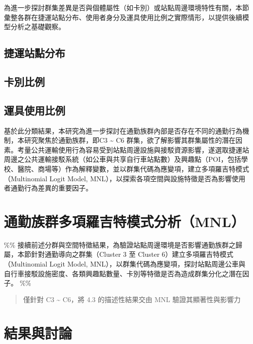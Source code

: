 為進一步探討群集差異是否與個體屬性（如卡別）或站點周邊環境特性有關，本節彙整各群在捷運站點分布、使用者身分及運具使用比例之實際情形，以提供後續模型分析之基礎觀察。

\subsection{捷運站點分布}\label{ux6377ux904bux7ad9ux9edeux5206ux5e03}

\subsection{卡別比例}\label{ux5361ux5225ux6bd4ux4f8b}

\subsection{運具使用比例}\label{ux904bux5177ux4f7fux7528ux6bd4ux4f8b}

基於此分類結果，本研究為進一步探討在通勤族群內部是否存在不同的通勤行為機制，本研究聚焦於通勤族群，即C3
\textasciitilde{} C6
群集，欲了解影響其群集屬性的潛在因素。考量公共運輸使用行為容易受到站點周邊設施與接駁資源影響，遂選取捷運站周邊之公共運輸接駁系統（如公車與共享自行車站點數）及興趣點（POI，包括學校、醫院、商場等）作為解釋變數，並以群集代碼為應變項，建立多項羅吉特模式（Multinomial
Logit Model,
MNL），以探索各項空間與設施特徵是否為影響使用者通勤行為差異的重要因子。

\section{通勤族群多項羅吉特模式分析（MNL）}\label{ux901aux52e4ux65cfux7fa4ux591aux9805ux7f85ux5409ux7279ux6a21ux5f0fux5206ux6790mnl}

\%\%
接續前述分群與空間特徵結果，為驗證站點周邊環境是否影響通勤族群之歸屬，本節針對通勤導向之群集（Cluster
3 至 Cluster 6）建立多項羅吉特模式（Multinomial Logit Model,
MNL），以群集代碼為應變項，探討站點周邊公車與自行車接駁設施密度、各類興趣點數量、卡別等特徵是否為造成群集分化之潛在因子。
\%\%

\begin{quote}
僅針對 C3 \textasciitilde{} C6，將 4.3 的描述性結果交由 MNL
驗證其顯著性與影響力
\end{quote}

\section{結果與討論}\label{ux7d50ux679cux8207ux8a0eux8ad6}
